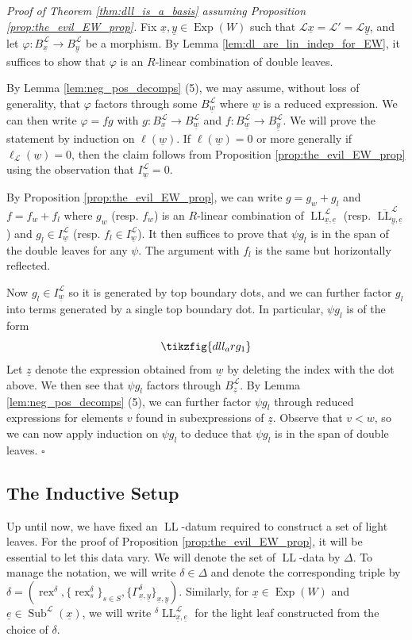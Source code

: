 \documentclass{amsart}
\newcommand{\scrL}{\mathcal{L}}
\DeclareMathOperator{\rex}{rex}
\DeclareMathOperator{\LL}{LL}
\DeclareMathOperator{\Exp}{Exp}
\DeclareMathOperator{\Subexp}{Sub}
\newcommand{\ue}{\underline{e}}
\newcommand{\uw}{\underline{w}}
\newcommand{\ux}{\underline{x}}
\newcommand{\uy}{\underline{y}}
\theoremstyle{definition}
\newenvironment{midsecproof}[1]{\vspace{\topsep} \noindent \textit{Proof of #1.}}{\hfill $\square$}
\numberwithin{equation}{subsection}
\begin{document}
\begin{midsecproof}{Theorem \ref{thm:dll_is_a_basis} assuming Proposition \ref{prop:the_evil_EW_prop}}
    Fix $\ux, \uy \in \Exp (W)$ such that $\scrL \ux = \scrL' = \scrL \uy$, and let $\varphi : B_{\ux}^{\scrL} \to B_{\uy}^{\scrL}$ be a morphism.
    By Lemma \ref{lem:dl_are_lin_indep_for_EW}, it suffices to show that $\varphi$ is an $R$-linear combination of double leaves.

    By Lemma \ref{lem:neg_pos_decomps} (5), we may assume, without loss of generality, that $\varphi$ factors through some $B_{\uw}^{\scrL}$ where $\uw$ is a reduced expression.
    We can then write $\varphi = fg$ with $g : B_{\ux}^{\scrL} \to B_{\uw}^{\scrL}$ and $f : B_{\uw}^{\scrL} \to B_{\uy}^{\scrL}$.
    We will prove the statement by induction on $\ell (\uw)$. If $\ell (\uw) = 0$ or more generally if $\ell_{\scrL} (\uw) = 0$, then the claim follows from Proposition \ref{prop:the_evil_EW_prop} using the observation that $I_{\uw}^{\scrL} = 0$.

    By Proposition \ref{prop:the_evil_EW_prop}, we can write $g = g_w + g_l$ and $f = f_w + f_l$ where $g_w$ (resp. $f_w$) is an $R$-linear combination of $\LL_{\ux, \ue}^{\scrL}$ (resp. $\overline{\LL}_{\uy, \ue}^{\scrL}$) and $g_l \in I_{\uw}^{\scrL}$ (resp. $f_l \in I_{\uw}^{\scrL}$).
    It then suffices to prove that $\psi g_l$ is in the span of the double leaves for any $\psi$. The argument with $f_l$ is the same but horizontally reflected.
    
    Now $g_l \in I_{\uw}^{\scrL}$ so it is generated by top boundary dots, and we can further factor $g_l$ into terms generated by a single top boundary dot. In particular, $\psi g_l$ is of the form
    \[\tikzfig{dll_arg_1}\]
    Let $\underline{z}$ denote the expression obtained from $\uw$ by deleting the index with the dot above.
    We then see that $\psi g_l$ factors through $B_{\underline{z}}^{\scrL}$. By Lemma \ref{lem:neg_pos_decomps} (5), we can further factor $\psi g_l$ through reduced expressions for elements $v$ found in subexpressions of $\underline{z}$.
    Observe that $v < w$, so we can now apply induction on $\psi g_l$ to deduce that $\psi g_l$ is in the span of double leaves.
\end{midsecproof}

\subsection{The Inductive Setup}

Up until now, we have fixed an $\LL$-datum required to construct a set of light leaves.
For the proof of Proposition \ref{prop:the_evil_EW_prop}, it will be essential to let this data vary.
We will denote the set of $\LL$-data by $\Delta$.
To manage the notation, we will write $\delta \in \Delta$ and denote the corresponding triple by $\delta = (\rex^{\delta} , \{ \rex_s^{\delta} \}_{s \in S}, \{\Gamma_{\ux, \uy}^{\delta} \}_{\ux, \uy})$.
Similarly, for $\ux \in \Exp (W)$ and $\ue \in \Subexp^{\scrL} (\ux)$, we will write ${}^{\delta} \LL_{\ux, \ue}^{\scrL}$ for the light leaf constructed from the choice of $\delta$.
\end{document}
